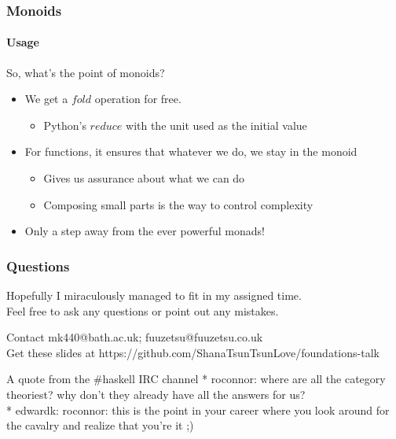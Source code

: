 \documentclass{beamer}
\begin{document}
\begin{frame}
  \frametitle{Monoids}
  \framesubtitle{Usage}
  So, what's the point of monoids?
  \pause
  \begin{itemize}[<+->]
    \item We get a $fold$ operation for free.
      \begin{itemize}
        \item Python's $reduce$ with the unit used as the initial
          value
      \end{itemize}
    \item For functions, it ensures that whatever we do, we stay in
      the monoid
      \begin{itemize}
        \item Gives us assurance about what we can do
        \item Composing small parts is the way to control complexity
      \end{itemize}
    \item Only a step away from the ever powerful monads!
  \end{itemize}
\end{frame}
\begin{frame}
  \frametitle{Questions}
  Hopefully I miraculously managed to fit in my assigned time.\\
  Feel free to ask any questions or point out any mistakes.
  \begin{block}{Contact}
    mk440@bath.ac.uk; fuuzetsu@fuuzetsu.co.uk\\
    Get these slides at
    https://github.com/ShanaTsunTsunLove/foundations-talk
  \end{block}
  \begin{block}{A quote from the \#haskell IRC channel}
    * roconnor: where are all the category theoriest? why don't they
    already have all the answers for us?\\
    * edwardk: roconnor: this is the point in your career where you look
    around for the cavalry and realize that you're it ;)
  \end{block}
\end{frame}
\end{document}
